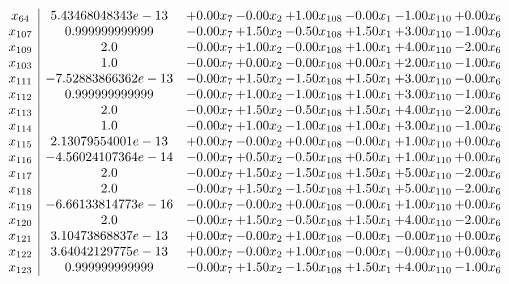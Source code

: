\documentclass[8pt]{article}
\begin{document}
\[\begin{array}{c| c c@{\hskip 2pt} c@{\hskip 2pt} c@{\hskip 2pt} c@{\hskip 2pt} c@{\hskip 2pt} c@{\hskip 2pt} }
 x_{64}   &  5.43468048343e-13 & +  0.00 x_{7} & -0.00 x_{2} & +  1.00 x_{108} & -0.00 x_{1} & -1.00 x_{110} & +  0.00 x_{6}\\
 x_{107}   &  0.999999999999 & -0.00 x_{7} & +  1.50 x_{2} & -0.50 x_{108} & +  1.50 x_{1} & +  3.00 x_{110} & -1.00 x_{6}\\
 x_{109}   &  2.0 & -0.00 x_{7} & +  1.00 x_{2} & -0.00 x_{108} & +  1.00 x_{1} & +  4.00 x_{110} & -2.00 x_{6}\\
 x_{103}   &  1.0 & -0.00 x_{7} & +  0.00 x_{2} & -0.00 x_{108} & +  0.00 x_{1} & +  2.00 x_{110} & -1.00 x_{6}\\
 x_{111}   &  -7.52883866362e-13 & -0.00 x_{7} & +  1.50 x_{2} & -1.50 x_{108} & +  1.50 x_{1} & +  3.00 x_{110} & -0.00 x_{6}\\
 x_{112}   &  0.999999999999 & -0.00 x_{7} & +  1.00 x_{2} & -1.00 x_{108} & +  1.00 x_{1} & +  3.00 x_{110} & -1.00 x_{6}\\
 x_{113}   &  2.0 & -0.00 x_{7} & +  1.50 x_{2} & -0.50 x_{108} & +  1.50 x_{1} & +  4.00 x_{110} & -2.00 x_{6}\\
 x_{114}   &  1.0 & -0.00 x_{7} & +  1.00 x_{2} & -1.00 x_{108} & +  1.00 x_{1} & +  3.00 x_{110} & -1.00 x_{6}\\
 x_{115}   &  2.13079554001e-13 & +  0.00 x_{7} & -0.00 x_{2} & +  0.00 x_{108} & -0.00 x_{1} & +  1.00 x_{110} & +  0.00 x_{6}\\
 x_{116}   &  -4.56024107364e-14 & -0.00 x_{7} & +  0.50 x_{2} & -0.50 x_{108} & +  0.50 x_{1} & +  1.00 x_{110} & +  0.00 x_{6}\\
 x_{117}   &  2.0 & -0.00 x_{7} & +  1.50 x_{2} & -1.50 x_{108} & +  1.50 x_{1} & +  5.00 x_{110} & -2.00 x_{6}\\
 x_{118}   &  2.0 & -0.00 x_{7} & +  1.50 x_{2} & -1.50 x_{108} & +  1.50 x_{1} & +  5.00 x_{110} & -2.00 x_{6}\\
 x_{119}   &  -6.66133814773e-16 & -0.00 x_{7} & -0.00 x_{2} & +  0.00 x_{108} & -0.00 x_{1} & +  1.00 x_{110} & +  0.00 x_{6}\\
 x_{120}   &  2.0 & -0.00 x_{7} & +  1.50 x_{2} & -0.50 x_{108} & +  1.50 x_{1} & +  4.00 x_{110} & -2.00 x_{6}\\
 x_{121}   &  3.10473868837e-13 & +  0.00 x_{7} & -0.00 x_{2} & +  1.00 x_{108} & -0.00 x_{1} & -0.00 x_{110} & +  0.00 x_{6}\\
 x_{122}   &  3.64042129775e-13 & +  0.00 x_{7} & -0.00 x_{2} & +  1.00 x_{108} & -0.00 x_{1} & -0.00 x_{110} & +  0.00 x_{6}\\
 x_{123}   &  0.999999999999 & -0.00 x_{7} & +  1.50 x_{2} & -1.50 x_{108} & +  1.50 x_{1} & +  4.00 x_{110} & -1.00 x_{6}\\

\end{array}\]
\end{document}
